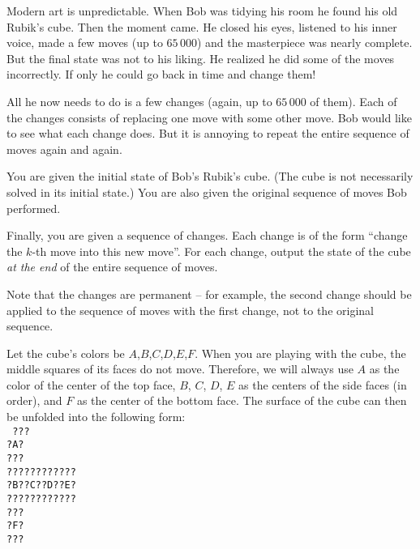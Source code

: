 





Modern art is unpredictable.
When Bob was tidying his room he found his old Rubik's cube.
Then the moment came.
He closed his eyes, listened to his inner voice,
made a few moves (up to $65\,000$) and the masterpiece was nearly complete.
But the final state was not to his liking. He realized he
did some of the moves incorrectly. If only he could go back in time
and change them!

All he now needs to do is a few changes (again, up to $65\,000$ of them).
Each of the changes consists of replacing one move with some other move.
Bob would like to see what each change does.
But it is annoying to repeat the entire sequence
of moves again and again.


You are given the initial state of Bob's Rubik's cube.
(The cube is not necessarily solved in its initial state.)
You are also given the original sequence of moves Bob performed.

Finally, you are given a sequence of changes.
Each change is of the form ``change the $k$-th move into this new move''.
For each change, output the state of the cube \emph{at the end} of the
entire sequence of moves.

Note that the changes are permanent -- for example, the second change
should be applied to the sequence of moves with the first change,
not to the original sequence.


Let the cube's colors be $A$,$B$,$C$,$D$,$E$,$F$.
When you are playing with the cube,
the middle squares of its faces do not move.
Therefore, we will always use $A$
as the color of the center of the top face,
$B$, $C$, $D$, $E$ as the centers of the side faces (in order),
and $F$ as the center of the bottom face.
The surface of the cube can then be unfolded into the following form:\\
\texttt{
???\\
?A?\\
???\\
????????????\\
?B??C??D??E?\\
????????????\\
???\\
?F?\\
???\\
}

